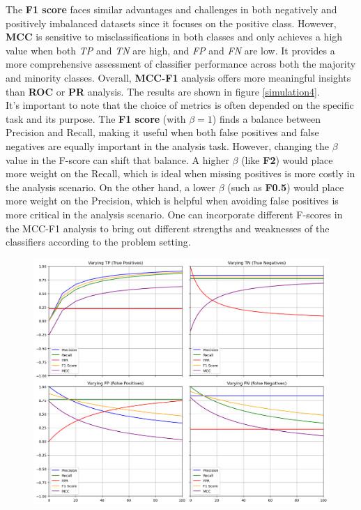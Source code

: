 \documentclass[12pt, oneside]{amsart}
\theoremstyle{definition}
\theoremstyle{remark}
\numberwithin{equation}{section}
\begin{document}
The \textbf{F1 score} faces similar advantages and challenges in both negatively and positively imbalanced datasets since it focuses on the positive class. However, \textbf{MCC} is sensitive to misclassifications in both classes and only achieves a high value when both \textit{TP} and \textit{TN} are high, and \textit{FP} and \textit{FN} are low. It provides a more comprehensive assessment of classifier performance across both the majority and minority classes. Overall, \textbf{MCC-F1} analysis offers more meaningful insights than \textbf{ROC} or \textbf{PR} analysis. The results are shown in figure \ref{simulation4}.  \\

It’s important to note that the choice of metrics is often depended on the specific task and its purpose. The \textbf{F1 score} (with $\beta=1$) finds a balance between Precision and Recall, making it useful when both false positives and false negatives are equally important in the analysis task. However, changing the $\beta$  value in the F-score can shift that balance. A higher $\beta$ (like \textbf{F2}) would place more weight on the Recall, which is ideal when missing positives is more costly in the analysis scenario. On the other hand, a lower $\beta$ (such as \textbf{F0.5}) would place more weight on the Precision, which is helpful when avoiding false positives is more critical in the analysis scenario. One can incorporate different F-scores in the MCC-F1 analysis to bring out different strengths and weaknesses of the classifiers according to the problem setting.
\begin{figure}[hbt!]
    \centering
    \includegraphics[scale=0.35]{Report/Figure/simulation3.jpg}
    \caption{}
    \label{simulation3}
\end{figure}
\FloatBarrier
\end{document}
